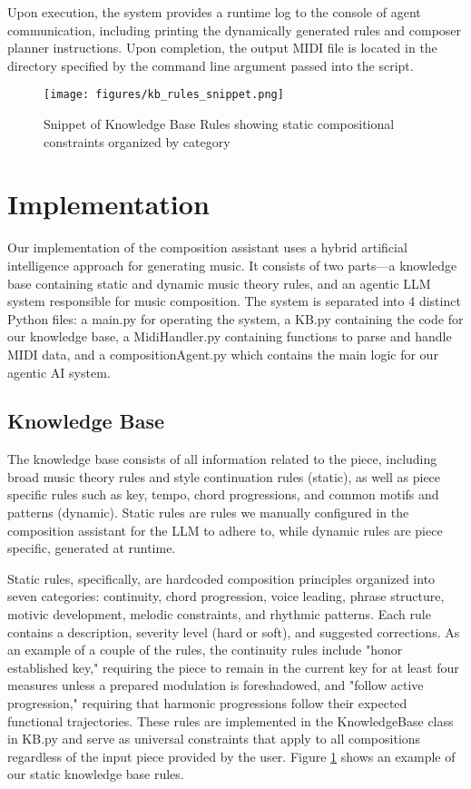 \documentclass[conference]{IEEEtran}
\begin{document}
Upon execution, the system provides a runtime log to the console of agent communication, including printing the dynamically generated rules and composer planner instructions. Upon completion, the output MIDI file is located in the directory specified by the command line argument passed into the script. 

\begin{figure}[htbp]
\centering
\texttt{[image: figures/kb\_rules\_snippet.png]}
\caption{Snippet of Knowledge Base Rules showing static compositional constraints organized by category}
\label{fig:kb_rules}
\end{figure} 

\section{Implementation}

Our implementation of the composition assistant uses a hybrid artificial intelligence approach for generating music. It consists of two parts—a knowledge base containing static and dynamic music theory rules, and an agentic LLM system responsible for music composition. The system is separated into 4 distinct Python files: a main.py for operating the system, a KB.py containing the code for our knowledge base, a MidiHandler.py containing functions to parse and handle MIDI data, and a compositionAgent.py which contains the main logic for our agentic AI system. 

\subsection{Knowledge Base}

The knowledge base consists of all information related to the piece, including broad music theory rules and style continuation rules (static), as well as piece specific rules such as key, tempo, chord progressions, and common motifs and patterns (dynamic). Static rules are rules we manually configured in the composition assistant for the LLM to adhere to, while dynamic rules are piece specific, generated at runtime.  

Static rules, specifically, are hardcoded composition principles organized into seven categories: continuity, chord progression, voice leading, phrase structure, motivic development, melodic constraints, and rhythmic patterns. Each rule contains a description, severity level (hard or soft), and suggested corrections. As an example of a couple of the rules, the continuity rules include "honor established key," requiring the piece to remain in the current key for at least four measures unless a prepared modulation is foreshadowed, and "follow active progression," requiring that harmonic progressions follow their expected functional trajectories. These rules are implemented in the KnowledgeBase class in KB.py and serve as universal constraints that apply to all compositions regardless of the input piece provided by the user. 
Figure \ref{fig:kb_rules} shows an example of our static knowledge base rules. 
\end{document}
